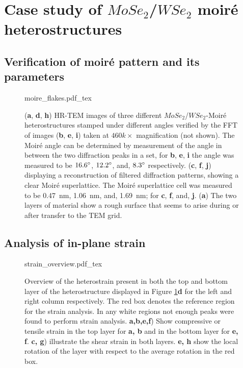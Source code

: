 \section{Case study of $MoSe_2$/$WSe_2$ moiré heterostructures}

\subsection{Verification of moiré pattern and its parameters}

\begin{figure}[t]
    \centering
    \def\svgwidth{.9\linewidth}
    {moire_flakes.pdf_tex}
    \caption{(\textbf{a}, \textbf{d}, \textbf{h}) HR-TEM images of three different $MoSe_2$/$WSe_2$-Moiré heterostructures stamped under different angles verified by the FFT of images (\textbf{b}, \textbf{e}, \textbf{i}) taken at $460k\times$ magnification (not shown). The Moiré angle can be determined by measurement of the angle in between the two diffraction peaks in a set, for \textbf{b}, \textbf{e}, \textbf{i} the angle was measured to be $16.6\degree$, $12.2\degree$, and, $8.3\degree$ respectively. (\textbf{c}, \textbf{f}, \textbf{j}) displaying a reconstruction of filtered diffraction patterns, showing a clear Moiré superlattice. The Moiré superlattice cell was measured to be \SI{0.47}{nm}, \SI{1.06}{nm}, and, \SI{1.69}{nm}; for \textbf{c}, \textbf{f}, and, \textbf{j}. (\textbf{a}) The two layers of material show a rough surface that seems to arise during or after transfer to the TEM grid.}
    \label{fig:moire_overview}
\end{figure}




\subsection{Analysis of in-plane strain}
\begin{figure}[t]
    \centering
    \def\svgwidth{.74\linewidth}
    {strain_overview.pdf_tex}
    \caption{Overview of the heterostrain present in both the top and bottom layer of the heterostructure displayed in Figure \ref{fig:moire_overview}\textbf{d} for the left and right column respectively. The red box denotes the reference region for the strain analysis. In any white regions not enough peaks were found to perform strain analysis. \textbf{a,b,e,f}) Show compressive or tensile strain in the top layer for \textbf{a, b} and in the bottom layer for \textbf{e, f}. \textbf{c, g}) illustrate the shear strain in both layers. \textbf{e, h} show the local rotation of the layer with respect to the average rotation in the red box.}
    \label{fig:strain_overview}
\end{figure}

